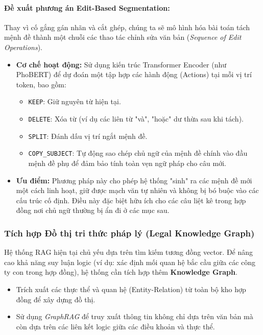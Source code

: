 \paragraph{Đề xuất phương án Edit-Based Segmentation:}
Thay vì cố gắng gán nhãn và cắt ghép, chúng ta sẽ mô hình hóa bài toán tách mệnh đề thành một chuỗi các thao tác chỉnh sửa văn bản (\textit{Sequence of Edit Operations}). 
\begin{itemize}
    \item \textbf{Cơ chế hoạt động:} Sử dụng kiến trúc Transformer Encoder (như PhoBERT) để dự đoán một tập hợp các hành động (Actions) tại mỗi vị trí token, bao gồm:
    \begin{itemize}
        \item \texttt{KEEP}: Giữ nguyên từ hiện tại.
        \item \texttt{DELETE}: Xóa từ (ví dụ các liên từ "và", "hoặc" dư thừa sau khi tách).
        \item \texttt{SPLIT}: Đánh dấu vị trí ngắt mệnh đề.
        \item \texttt{COPY\_SUBJECT}: Tự động sao chép chủ ngữ của mệnh đề chính vào đầu mệnh đề phụ để đảm bảo tính toàn vẹn ngữ pháp cho câu mới.
    \end{itemize}
    \item \textbf{Ưu điểm:} Phương pháp này cho phép hệ thống "sinh" ra các mệnh đề mới một cách linh hoạt, giữ được mạch văn tự nhiên và không bị bó buộc vào các cấu trúc cố định. Điều này đặc biệt hữu ích cho các câu liệt kê trong hợp đồng nơi chủ ngữ thường bị ẩn đi ở các mục sau.
\end{itemize}

\subsubsection{Tích hợp Đồ thị tri thức pháp lý (Legal Knowledge Graph)}
Hệ thống RAG hiện tại chủ yếu dựa trên tìm kiếm tương đồng vector. Để nâng cao khả năng suy luận logic (ví dụ: xác định mối quan hệ bắc cầu giữa các công ty con trong hợp đồng), hệ thống cần tích hợp thêm \textbf{Knowledge Graph}.
\begin{itemize}
    \item Trích xuất các thực thể và quan hệ (Entity-Relation) từ toàn bộ kho hợp đồng để xây dựng đồ thị.
    \item Sử dụng \textit{GraphRAG} để truy xuất thông tin không chỉ dựa trên văn bản mà còn dựa trên các liên kết logic giữa các điều khoản và thực thể.
\end{itemize}

